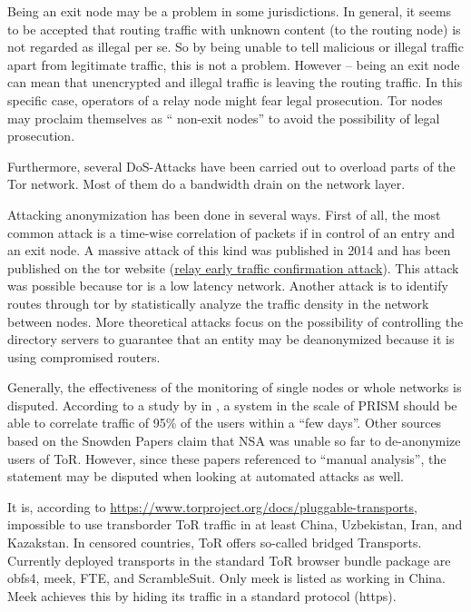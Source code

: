 Being an exit node may be a problem in some jurisdictions. In general, it seems to be accepted that routing traffic with unknown content (to the routing node) is not regarded as illegal per se. So by being unable to tell malicious or illegal traffic apart from legitimate traffic, this is not a problem. However -- being an exit node can mean that unencrypted and illegal traffic is leaving the routing traffic. In this specific case, operators of a relay node might fear legal prosecution. Tor nodes may proclaim themselves as  `` non-exit nodes''  to avoid the possibility of legal prosecution.

Furthermore, several DoS-Attacks have been carried out to overload parts of the Tor network. Most of them do a bandwidth drain on the network layer.

Attacking anonymization has been done in several ways. First of all, the most common attack is a time-wise correlation of packets if in control of an entry and an exit node. A massive attack of this kind was published in 2014 and has been published on the tor website (\href{https://blog.torproject.org/blog/tor-security-advisory-relay-early-traffic-confirmation-attack}{relay early traffic confirmation attack}). This attack was possible because tor is a low latency network. Another attack is to identify routes through tor by statistically analyze the traffic density in the network between nodes. More theoretical attacks focus on the possibility of controlling the directory servers to guarantee that an entity may be deanonymized because it is using compromised routers.

Generally, the effectiveness of the monitoring of single nodes or whole networks is disputed. According to a study by \citeauthor{ccs2013-usersrouted} in \citeyear{ccs2013-usersrouted}\cite{ccs2013-usersrouted}, a system in the scale of PRISM should be able to correlate traffic of 95\% of the users within a ``few days''. Other sources based on the Snowden Papers claim that NSA was unable so far to de-anonymize users of  ToR. However, since these papers referenced to ``manual analysis'', the statement may be disputed when looking at automated attacks as well.

It is, according to \url{https://www.torproject.org/docs/pluggable-transports}, impossible to use transborder ToR traffic in at least China, Uzbekistan, Iran, and Kazakstan. In censored countries, ToR offers so-called bridged Transports. Currently deployed transports in the standard ToR browser bundle package are obfs4, meek, FTE, and ScrambleSuit. Only meek is listed as working in China. Meek achieves this by hiding its traffic in a standard protocol (https).

